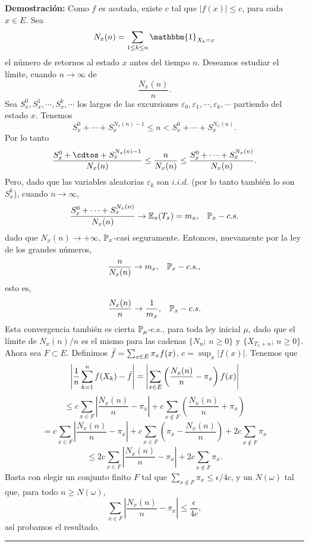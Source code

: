 \textbf{Demostración: }Como $f$ es acotada, existe $c$ tal que $|f(x)|\leq c$, para cada $x\in E$. Sea
\[N_x(n) = \sum_{1\leq k\leq n}\mathbbm{1}_{X_k=x}\]
el número de retornos al estado $x$ antes del tiempo $n$. Deseamos estudiar el límite, cuando $n\rightarrow \infty$ de
\[\frac{N_x(n)}{n}.\]
Sea $S_x^0,S_x^1,\cdots,S_x^k,\cdots$ los largos de las excursiones $\varepsilon_0,\varepsilon_1,\cdots, \varepsilon_k,\cdots$ partiendo del estado $x$. Tenemos
\[S_x^0 + \cdots + S_x^{N_x(n)-1}\leq n < S_x^0+\cdots + S_x^{N_x(n)}.\]
Por lo tanto
\[\frac{S_x^0 + \cdtos + S_x^{N_x(n)-1}}{N_x(n)}\leq \frac{n}{N_x(n)}\leq \frac{S_x^0 + \cdots + S_x^{N_x(n)}}{N_x(n)}.\]
Pero, dado que las variables aleatorias $\varepsilon_k$ son $i.i.d.$ (por lo tanto también lo son $S_x^k$), cuando $n\rightarrow \infty$,
\[\frac{S_x^0+\cdots+ S_x^{N_x(n)}}{N_x(n)} \rightarrow \mathbb E_x(T_x) = m_x,\hspace{0.3cm}\mathbb{P}_x-c.s.\]
dado que $N_x(n)\rightarrow +\infty$, $\mathbb{P}_x$-casi seguramente. Entonces, nuevamente por la ley de los grandes números,
\[\frac{n}{N_x(n)}\rightarrow m_x,\hspace{0.3cm}\mathbb{P}_x-c.s.,\]
esto es,
\[\frac{N_x(n)}{n}\rightarrow\frac{1}{m_x},\hspace{0.3cm}\mathbb{P}_x-c.s.\]
Esta convergencia también es cierta $\mathbb{P}_{\mu}$-c.s., para toda ley inicial $\mu$, dado que el límite de $N_x(n)/n$ es el mismo para las cadenas $\{N_n;\,n\geq 0\}$ y $\{X_{T_x+n};\,n\geq 0\}$.\\ \newline
Ahora sea $F\subset E$. Definimos $\Bar{f} = \sum_{x\in E}\pi_xf(x)$, $c=\sup_x|f(x)|$. Tenemos que
\[\left| \frac{1}{n}\sum_{k=1}^n f(X_k) - \Bar{f}\right| = \left| \sum_{x\in E}\left(\frac{N_x(n)}{n}-\pi_x\right)f(x)\right|\]
\[\leq c\sum_{x\in F}\left|\frac{N_x(n)}{n}-\pi_x\right| + c\sum_{x\notin F}\left(\frac{N_x(n)}{n} + \pi_x\right)\]
\[= c\sum_{x\in F}\left|\frac{N_x(n)}{n} -\pi_x\right| + c\sum_{x\in F}\left(\pi_x - \frac{N_x(n)}{n}\right) + 2c\sum_{x \notin F}\pi_x\]
\[\leq 2c \sum_{x \in F}\left| \frac{N_x(n)}{n}-\pi_x\right| + 2c\sum_{x \notin F}\pi_x.\]
Basta con elegir un conjunto finito $F$ tal que $\sum_{x \notin F}\pi_x\leq \epsilon/4c$, y un $N(\omega)$ tal que, para todo $n\geq N(\omega)$,
\[\sum_{x\in F}\left|\frac{N_x(n)}{n}-\pi_x\right| \leq \frac{\epsilon}{4c},\]
así probamos el resultado.\\
\rule{0.7em}{0.7em}\\ \newline

